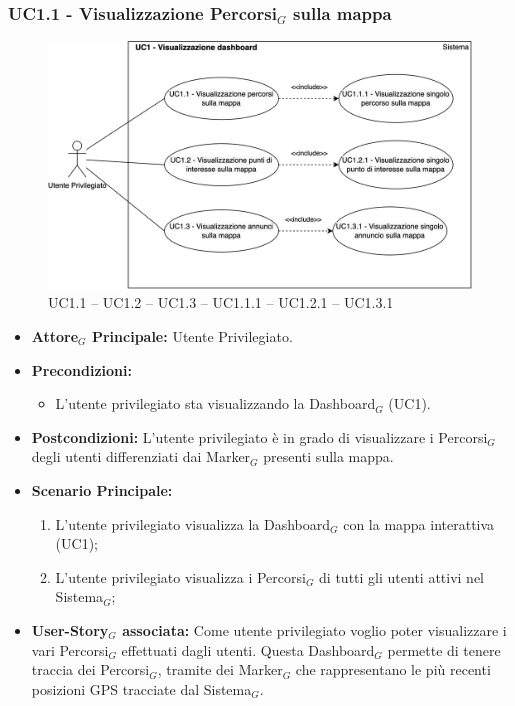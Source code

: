 \documentclass[10pt]{article}
\begin{document}
\begin{justify}
\subsubsection{\textbf{UC1.1 - Visualizzazione Percorsi$_G$ sulla mappa}}
\begin{figure}[H]
    \centering
    \includegraphics[width=0.7\linewidth]{UC1.123image.png}
    \caption{ UC1.1 -- UC1.2 -- UC1.3 -- UC1.1.1 -- UC1.2.1 -- UC1.3.1}
    \label{fig:UC1.1}
\end{figure}
\label{UC1.1}
\begin{itemize}
     \item \textbf{Attore$_G$ Principale:} Utente Privilegiato.
     \item \textbf{Precondizioni:}
        \begin{itemize}
    		\item L'utente privilegiato sta visualizzando la Dashboard$_G$ (UC1).
        \end{itemize}
     \item \textbf{Postcondizioni:} L'utente privilegiato è in grado di visualizzare i Percorsi$_G$ degli utenti differenziati dai Marker$_G$ presenti sulla mappa.
     \item \textbf{Scenario Principale:}
        \begin{enumerate}
            \item L'utente privilegiato visualizza la Dashboard$_G$ con la mappa interattiva (UC1);
            \item L'utente privilegiato visualizza i Percorsi$_G$ di tutti gli utenti attivi nel Sistema$_G$;
        \end{enumerate}
     \item \textbf{User-Story$_G$ associata:}
     Come utente privilegiato voglio poter visualizzare i vari Percorsi$_G$ effettuati dagli utenti. Questa Dashboard$_G$ permette di tenere traccia dei Percorsi$_G$, tramite dei Marker$_G$ che rappresentano le più recenti posizioni GPS tracciate dal Sistema$_G$.
\end{itemize}

\end{justify}
\end{document}
